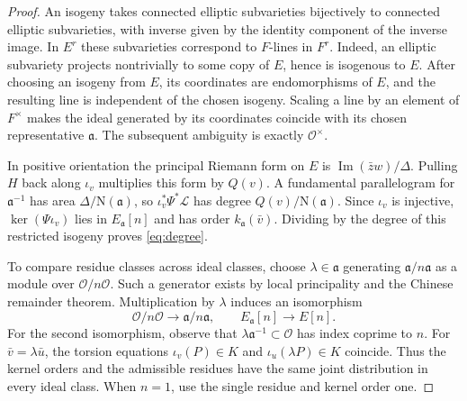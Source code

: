 \documentclass[11pt,letterpaper]{amsart}
\theoremstyle{definition}
\numberwithin{equation}{section}
\newcommand{\OO}{\mathcal O}
\newcommand{\NN}{\mathrm N}
\begin{document}
\begin{proof}
An isogeny takes connected elliptic subvarieties bijectively to
connected elliptic subvarieties, with inverse given by the identity
component of the inverse image. In \(E^r\) these subvarieties
correspond to \(F\)-lines in \(F^r\). Indeed, an elliptic subvariety
projects nontrivially to some copy of \(E\), hence is isogenous to
\(E\). After choosing an isogeny from \(E\), its coordinates are
endomorphisms of \(E\), and the resulting line is independent of the
chosen isogeny. Scaling a line by an element of \(F^\times\) makes
the ideal generated by its coordinates coincide with its chosen
representative \(\mathfrak a\). The subsequent ambiguity is exactly
\(\OO^\times\).

In positive orientation the principal Riemann form on \(E\) is
\(\operatorname{Im}(\bar zw)/\Delta\).
Pulling \(H\) back along \(\iota_v\) multiplies this form by \(Q(v)\).
A fundamental parallelogram for \(\mathfrak a^{-1}\) has area
\(\Delta/\NN(\mathfrak a)\), so \(\iota_v^*\Psi^*\mathcal L\) has
degree \(Q(v)/\NN(\mathfrak a)\). Since \(\iota_v\) is injective,
\(\ker(\Psi\iota_v)\) lies in \(E_{\mathfrak a}[n]\) and has order
\(k_{\mathfrak a}(\bar v)\). Dividing by the degree of this restricted
isogeny proves \eqref{eq:degree}.

To compare residue classes across ideal classes, choose
\(\lambda\in\mathfrak a\) generating \(\mathfrak a/n\mathfrak a\)
as a module over \(\OO/n\OO\). Such a generator exists by local
principality and the Chinese remainder theorem. Multiplication by
\(\lambda\) induces an isomorphism
\[
 \OO/n\OO \longrightarrow \mathfrak a/n\mathfrak a,\qquad
 E_{\mathfrak a}[n]\longrightarrow E[n].
\]
For the second isomorphism, observe that
\(\lambda\mathfrak a^{-1}\subset\OO\) has index coprime to \(n\).
For \(\bar v=\lambda\bar u\), the torsion equations
\(\iota_v(P)\in K\) and \(\iota_u(\lambda P)\in K\) coincide.
Thus the kernel orders and the admissible residues have the same
joint distribution in every ideal class. When \(n=1\), use the
single residue and kernel order one.


\end{proof}
\end{document}
